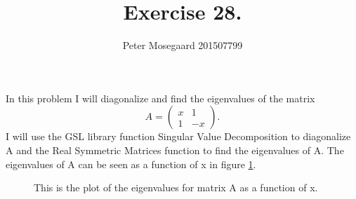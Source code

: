 \documentclass{article}
\begin{document}
\title{Exercise 28.}
\author{Peter Mosegaard 201507799}
\maketitle
In this problem I will diagonalize and find the eigenvalues of the matrix
\begin{equation}
A=\begin{pmatrix}
x & 1 \\
1 & -x
\end{pmatrix}.
\end{equation}
I will use the GSL library function Singular Value Decomposition to diagonalize A and the Real Symmetric Matrices function to find the eigenvalues of A. The eigenvalues of A can be seen as a function of x in figure \ref{f1}.

\begin{figure}[h]

\label{f1}
\caption{This is the plot of the eigenvalues for matrix A as a function of x.}
\end{figure}
\end{document}
